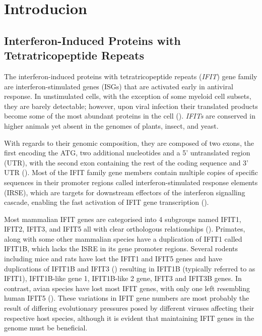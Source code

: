 \chapter{Introducion} \label{ch:Introduction}
\section{Interferon-Induced Proteins with Tetratricopeptide Repeats} \label{sec:Interferon-Induced Proteins with Tetratricopeptide Repeats}
The interferon-induced proteins with tetratricopeptide repeats (\textit{IFIT}) gene family are interferon-stimulated genes (ISGs) that are activated early in antiviral response. In unstimulated cells, with the exception of some myeloid cell subsets, they are barely detectable; however, upon viral infection their translated products become some of the most abundant proteins in the cell (\cite{Diamond2013TheProteins}). \textit{IFITs} are conserved in higher animals yet absent in the genomes of plants, insect, and yeast. 

With regards to their genomic composition, they are composed of two exons, the first encoding the ATG, two additional nucleotides and a 5' untranslated region (UTR), with the second exon containing the rest of the coding sequence and 3' UTR (\cite{deVeer1998IFI60/ISG60/IFIT4Genes}). Most of the IFIT family gene members contain multiple copies of specific sequences in their promoter regions called interferon-stimulated response elements (IRSE), which are targets for downstream effectors of the interferon signalling cascade, enabling the fast activation of IFIT gene transcription (\cite{Lou2009Ifr-9/stat2Stat1}).   

Most mammalian IFIT genes are categorised into 4 subgroups named IFIT1, IFIT2, IFIT3, and IFIT5 all with clear orthologous relationships (\cite{Sarkar2004NovelGenes}). Primates, along with some other mammalian species have a duplication of IFIT1 called IFIT1B, which lacks the ISRE in its gene promoter regions. Several rodents including mice and rats have lost the IFIT1 and IFIT5 genes and have duplications of IFIT1B and IFIT3 (\cite{Daugherty2016Evolution-guidedMammals.}) resulting in IFIT1B (typically referred to as IFIT1), IFIT1B-like gene 1, IFIT1B-like 2 gene, IFIT3 and IFIT3B genes. In contrast, avian species have lost most IFIT genes, with only one left resembling human IFIT5 (\cite{Liu2013Lineage-SpecificFamily}). These variations in IFIT gene numbers are most probably the result of differing evolutionary pressures posed by different viruses affecting their respective host species, although it is evident that maintaining IFIT genes in the genome must be beneficial. 




